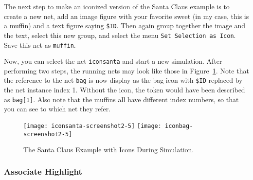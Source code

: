 The next step to make an iconized version of the Santa Claus example
is to create a new net, add an image figure with your favorite sweet
(in my case, this is a muffin) and a text figure saying \texttt{\$ID}.
Then again group together the image and the text, select this new
group, and select the menu \texttt{Set Selection as Icon}.
Save this net as \texttt{muffin}.

Now, you can select the net \texttt{iconsanta} and  start a new
simulation. After performing two steps, the running nets may look like
those in Figure~\ref{fig:santabagmuffin}.
Note that the reference to the net \texttt{bag} is now display as the
bag icon with \texttt{\$ID} replaced by the net instance index 1.
Without the icon, the token would have been described as
\texttt{bag[1]}. Also note that the muffins all have different index
numbers, so that you can see to which net they refer.

\begin{figure}[htbp]
  \centerline{%
    \texttt{[image: iconsanta-screenshot2-5]}%
    \vspace{1pt}
    \texttt{[image: iconbag-screenshot2-5]}%
    }
  \caption{\label{fig:santabagmuffin}The Santa Claus Example with
    Icons During Simulation.}
\end{figure}%



\iffalse
\bug{
  There is a bug when putting connected text into a
  group. Whenever such a group is copied, Renew throws an
  exception. For example in case of a text element in a net icon, you
  have to be careful not to connect this text to the figure,
  because afterward you want to group together the text with the
  figure and Renew will try to copy this group figure during
  simulation.
  Unfortunately, connecting text happens quite easily when you move
  the unconnected text, as a figure below it will become its parent.
  Instead, you should move the figure below, not the text itself, and
  then move the group as a whole later on.
  Another possibility is to select the unconnected text and another
  figure, since when multiple figures are selected, Renew will not
  assign new parents.
}
\fi


\subsubsection{Associate Highlight}

